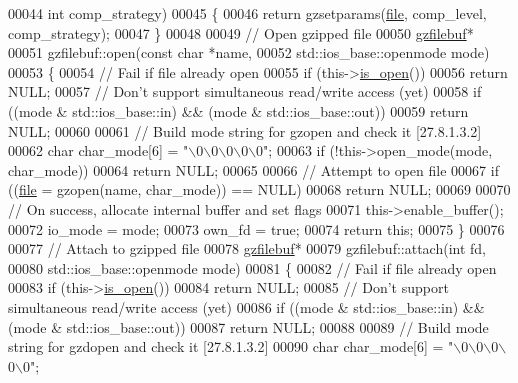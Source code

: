 \begin{DoxyCode}
00044                           \textcolor{keywordtype}{int} comp\_strategy)
00045 \{
00046   \textcolor{keywordflow}{return} gzsetparams(\hyperlink{structfile}{file}, comp\_level, comp\_strategy);
00047 \}
00048 
00049 \textcolor{comment}{// Open gzipped file}
00050 \hyperlink{classgzfilebuf}{gzfilebuf}*
00051 gzfilebuf::open(\textcolor{keyword}{const} \textcolor{keywordtype}{char} *name,
00052                 std::ios\_base::openmode mode)
00053 \{
00054   \textcolor{comment}{// Fail if file already open}
00055   \textcolor{keywordflow}{if} (this->\hyperlink{classgzofstream_acb1c9c6dccaf41bc5e44c2263ea48de3}{is\_open}())
00056     \textcolor{keywordflow}{return} NULL;
00057   \textcolor{comment}{// Don't support simultaneous read/write access (yet)}
00058   \textcolor{keywordflow}{if} ((mode & std::ios\_base::in) && (mode & std::ios\_base::out))
00059     \textcolor{keywordflow}{return} NULL;
00060 
00061   \textcolor{comment}{// Build mode string for gzopen and check it [27.8.1.3.2]}
00062   \textcolor{keywordtype}{char} char\_mode[6] = \textcolor{stringliteral}{"\(\backslash\)0\(\backslash\)0\(\backslash\)0\(\backslash\)0\(\backslash\)0"};
00063   \textcolor{keywordflow}{if} (!this->open\_mode(mode, char\_mode))
00064     \textcolor{keywordflow}{return} NULL;
00065 
00066   \textcolor{comment}{// Attempt to open file}
00067   \textcolor{keywordflow}{if} ((\hyperlink{structfile}{file} = gzopen(name, char\_mode)) == NULL)
00068     \textcolor{keywordflow}{return} NULL;
00069 
00070   \textcolor{comment}{// On success, allocate internal buffer and set flags}
00071   this->enable\_buffer();
00072   io\_mode = mode;
00073   own\_fd = \textcolor{keyword}{true};
00074   \textcolor{keywordflow}{return} \textcolor{keyword}{this};
00075 \}
00076 
00077 \textcolor{comment}{// Attach to gzipped file}
00078 \hyperlink{classgzfilebuf}{gzfilebuf}*
00079 gzfilebuf::attach(\textcolor{keywordtype}{int} fd,
00080                   std::ios\_base::openmode mode)
00081 \{
00082   \textcolor{comment}{// Fail if file already open}
00083   \textcolor{keywordflow}{if} (this->\hyperlink{classgzofstream_acb1c9c6dccaf41bc5e44c2263ea48de3}{is\_open}())
00084     \textcolor{keywordflow}{return} NULL;
00085   \textcolor{comment}{// Don't support simultaneous read/write access (yet)}
00086   \textcolor{keywordflow}{if} ((mode & std::ios\_base::in) && (mode & std::ios\_base::out))
00087     \textcolor{keywordflow}{return} NULL;
00088 
00089   \textcolor{comment}{// Build mode string for gzdopen and check it [27.8.1.3.2]}
00090   \textcolor{keywordtype}{char} char\_mode[6] = \textcolor{stringliteral}{"\(\backslash\)0\(\backslash\)0\(\backslash\)0\(\backslash\)0\(\backslash\)0"};

\end{DoxyCode}
